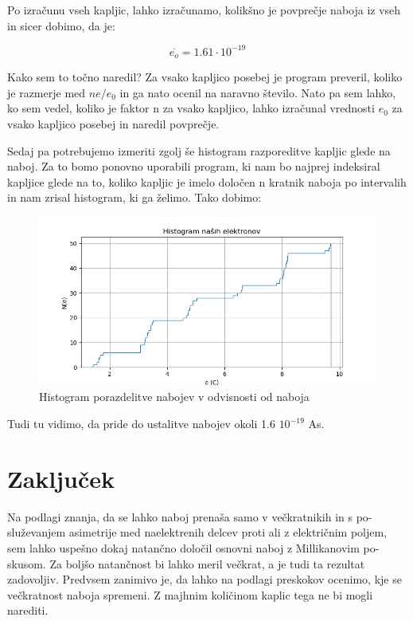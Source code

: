 \documentclass[11pt, a4paper]{article}
\theoremstyle{definition}
\theoremstyle{example}
\theoremstyle{izrek}
\begin{document}
Po izračunu vseh kapljic, lahko izračunamo, kolikšno je povprečje naboja iz vseh in sicer dobimo, da je:

$$\overline{e_o}= 1.61\cdot 10^{-19} $$

Kako sem to točno naredil?
Za vsako kapljico posebej je program preveril, koliko je razmerje med $ne/e_0$ in ga nato ocenil na naravno število. Nato pa sem lahko, ko sem vedel, koliko je faktor n za vsako kapljico, lahko izračunal vrednosti $e_0$ za vsako kapljico posebej in naredil povprečje.


Sedaj pa potrebujemo izmeriti zgolj še histogram razporeditve kapljic glede na naboj. Za to bomo ponovno uporabili program, ki nam bo najprej indeksiral kapljice glede na to, koliko kapljic je imelo določen n kratnik naboja po intervalih in nam zrisal histogram, ki ga želimo. Tako dobimo:
\begin{figure}[H]
	\centering
    \includegraphics[width=12cm]{Pravilen histogram,E.png}
    \caption{Histogram porazdelitve nabojev v odvisnosti od naboja}
\end{figure}

Tudi tu vidimo,  da pride do ustalitve nabojev okoli 1.6 $10^{-19}$ As.

\section{Zaključek}
Na podlagi znanja, da se lahko naboj prenaša samo v večkratnikih in s po-
služevanjem asimetrije med naelektrenih delcev proti ali z električnim poljem,
sem lahko uspešno dokaj natančno določil osnovni naboj z Millikanovim po-
skusom. Za boljšo natančnost bi lahko meril večkrat, a je tudi ta rezultat
zadovoljiv. Predvsem zanimivo je, da lahko na podlagi preskokov ocenimo,
kje se večkratnost naboja spremeni. Z majhnim količinom kaplic tega ne bi
mogli narediti.
\end{document}
